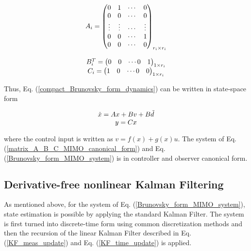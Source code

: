 \documentclass[journal]{IEEEtran}
\begin{document}
\begin{equation} \label{matrix_A_B_C_MIMO_canonical_form}
\begin{tabular}{c}
$A_i=\begin{pmatrix}
0 & 1 & \cdots & 0 \\
0 & 0 & \cdots & 0 \\
\vdots & \vdots & \cdots & \vdots \\
0 & 0 & \cdots & 1 \\
0 & 0 & \cdots & 0
\end{pmatrix}_{{r_i}\times{r_i}}$ \\
$ $\\
$B_i^T=\begin{pmatrix}
0 & 0 & \cdots 0 & 1
\end{pmatrix}_{1{\times}{r_i}}$ \\
$C_i=\begin{pmatrix}
1 & 0 & \cdots 0 & 0
\end{pmatrix}_{1{\times}{r_i}}$
\end{tabular}
\end{equation}

\noindent Thus, Eq. (\ref{compact_Brunovsky_form_dynamics}) can be written in state-space form

\begin{equation} \label{Brunovsky_form_MIMO_system}
\begin{tabular}{c}
$\dot{x}=Ax+Bv+B\tilde{d}$\\
$y={C}x$
\end{tabular}
\end{equation}

\noindent where the control input is written as $v=f(x)+g(x)u$. The system of Eq. (\ref{matrix_A_B_C_MIMO_canonical_form}) and Eq. (\ref{Brunovsky_form_MIMO_system}) is
in controller and observer canonical form.

\subsection{Derivative-free nonlinear Kalman Filtering} \label{subsection : flatness_based_control_2}

\noindent As mentioned above, for the system of Eq. (\ref{Brunovsky_form_MIMO_system}), state estimation is possible by applying the standard Kalman Filter. The system is first turned into discrete-time form using common discretization methods and then the recursion of the linear Kalman Filter described in Eq. (\ref{KF_meas_update}) and Eq. (\ref{KF_time_update}) is applied. \\
\end{document}
